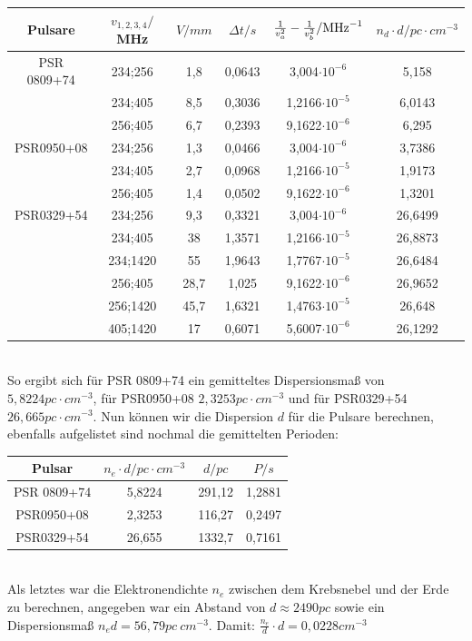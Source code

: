 \documentclass[12pt]{article}
\begin{document}
\begin{table}[!ht]
    \centering
    \begin{tabular}{c|c|c|c|c|c}
        Pulsare & $v_{1,2,3,4}/$ MHz & $V /mm$ & $\Delta t /s$ & $ \frac{1}{v^2_a} - \frac{1}{v_b^2} / \textnormal{MHz}^{-1}$ & $n_d \cdot d /pc \cdot cm^{-3}$ \\ \hline
        PSR 0809+74 & 234;256 & 1,8 & 0,0643 & 3,004$\cdot 10^{-6}$ & 5,158 \\ 
        ~ & 234;405 & 8,5 & 0,3036 & 1,2166$\cdot 10^{-5}$ & 6,0143 \\ 
        ~ & 256;405 & 6,7 & 0,2393 & 9,1622$\cdot 10^{-6}$ & 6,295 \\ \hline
        PSR0950+08 & 234;256 & 1,3 & 0,0466 & 3,004$\cdot 10^{-6}$ & 3,7386 \\ 
        ~ & 234;405 & 2,7 & 0,0968 & 1,2166$\cdot 10^{-5}$ & 1,9173 \\ 
        ~ & 256;405 & 1,4 & 0,0502 & 9,1622$\cdot 10^{-6}$ & 1,3201 \\ \hline
        PSR0329+54 & 234;256 & 9,3 & 0,3321 & 3,004$\cdot 10^{-6}$ & 26,6499 \\ 
        ~ & 234;405 & 38 & 1,3571 & 1,2166$\cdot 10^{-5}$ & 26,8873 \\ 
        ~ & 234;1420 & 55 & 1,9643 & 1,7767$\cdot 10^{-5}$ & 26,6484 \\ 
        ~ & 256;405 & 28,7 & 1,025 & 9,1622$\cdot 10^{-6}$ & 26,9652 \\ 
        ~ & 256;1420 & 45,7 & 1,6321 & 1,4763$\cdot 10^{-5}$ & 26,648 \\ 
        ~ & 405;1420 & 17 & 0,6071 & 5,6007$\cdot 10^{-6}$ & 26,1292 \\ 
    \end{tabular}
\end{table}\\
So ergibt sich für PSR 0809+74 ein gemitteltes Dispersionsmaß von $5,8224 pc \cdot cm^{-3}$, für PSR0950+08 $2,3253 pc \cdot cm^{-3}$ und für PSR0329+54 $26,665 pc \cdot cm^{-3}$. Nun können wir die Dispersion $d$ für die Pulsare berechnen, ebenfalls aufgelistet sind nochmal die gemittelten Perioden:
\begin{table}[!ht]
    \centering
    \begin{tabular}{c|c|c|c}
        Pulsar & $n_e \cdot d / pc \cdot cm^{-3}$ & $d / pc$ & $P / s$ \\ \hline
        PSR 0809+74 & 5,8224 & 291,12 & 1,2881 \\ 
        PSR0950+08 & 2,3253 & 116,27 & 0,2497 \\ 
        PSR0329+54 & 26,655 & 1332,7 & 0,7161 \\ 
    \end{tabular}
\end{table}\\
Als letztes war die Elektronendichte $n_e$ zwischen dem Krebsnebel und der Erde zu berechnen, angegeben war ein Abstand von $d \approx 2490 pc$ sowie ein Dispersionsmaß $n_e d = 56,79 pc \ cm^{-3}$. Damit: $\displaystyle \frac{n_e}{d} \cdot d = 0,0228 cm^{-3}$
\newpage\noindent
\end{document}
